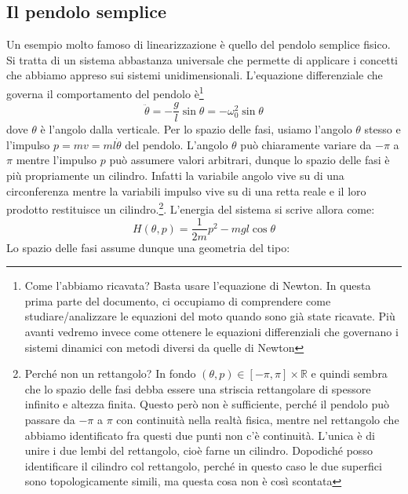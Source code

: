 \documentclass[a4paper,openany]{article}
\begin{document}
	\subsection{Il pendolo semplice}
	Un esempio molto famoso di linearizzazione è quello del pendolo semplice fisico. Si tratta di un sistema abbastanza universale che permette di applicare i concetti che abbiamo appreso sui sistemi unidimensionali. L'equazione differenziale che governa il comportamento del pendolo è\footnote{Come l'abbiamo ricavata? Basta usare l'equazione di Newton. In questa prima parte del documento, ci occupiamo di comprendere come studiare/analizzare le equazioni del moto quando sono già state ricavate. Più avanti vedremo invece come ottenere le equazioni differenziali che governano i sistemi dinamici con metodi diversi da quelle di Newton} \begin{equation}
		\ddot{\theta} =- \dfrac{g}{l}\sin\theta = -\omega_{0}^2 \sin\theta
	\end{equation}
	dove $\theta$ è l'angolo dalla verticale. Per lo spazio delle fasi, usiamo l'angolo $\theta$ stesso e l'impulso $p=mv = ml\dot{\theta}$ del pendolo. L'angolo $\theta$ può chiaramente variare da $-\pi$ a $\pi$ mentre l'impulso $p$ può assumere valori arbitrari, dunque lo spazio delle fasi è più propriamente un cilindro. Infatti la variabile angolo vive su di una circonferenza mentre la variabili impulso vive su di una retta reale e il loro prodotto restituisce un cilindro.\footnote{Perché non un rettangolo? In fondo $(\theta,p)\in[-\pi,\pi]\times\mathbb{R}$ e quindi sembra che lo spazio delle fasi debba essere una striscia rettangolare di spessore infinito e altezza finita. Questo però non è sufficiente, perché il pendolo può passare da $-\pi$ a $\pi$ con continuità nella realtà fisica, mentre nel rettangolo che abbiamo identificato fra questi due punti non c'è continuità. L'unica è di unire i due lembi del rettangolo, cioè farne un cilindro. Dopodiché posso identificare il cilindro col rettangolo, perché in questo caso le due superfici sono topologicamente simili, ma questa cosa non è così scontata}. L'energia del sistema si scrive allora come:
	$$
	H(\theta,p) = \dfrac{1}{2m}p^2- mgl\cos\theta 
	$$
	Lo spazio delle fasi assume dunque una geometria del tipo:
\end{document}
